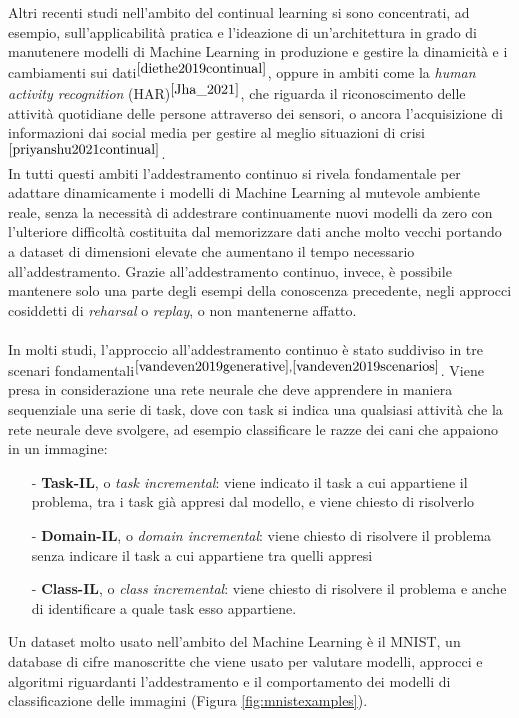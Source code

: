 Altri recenti studi nell'ambito del continual learning si sono concentrati, ad esempio, sull'applicabilità pratica e l'ideazione di un'architettura in grado di manutenere modelli di Machine Learning in produzione e gestire la dinamicità e i cambiamenti sui dati$^{\cite{diethe2019continual}}$, oppure in ambiti come la \textit{human activity recognition} (HAR)$^{\cite{Jha_2021}}$, che riguarda il riconoscimento delle attività quotidiane delle persone attraverso dei sensori, o ancora l'acquisizione di informazioni dai social media per gestire al meglio situazioni di crisi$^{\cite{priyanshu2021continual}}$.\\
In tutti questi ambiti l'addestramento continuo si rivela fondamentale per adattare dinamicamente i modelli di Machine Learning al mutevole ambiente reale, senza la necessità di addestrare continuamente nuovi modelli da zero con l'ulteriore difficoltà costituita dal memorizzare dati anche molto vecchi portando a dataset di dimensioni elevate che aumentano il tempo necessario all'addestramento. Grazie all'addestramento continuo, invece, è possibile mantenere solo una parte degli esempi della conoscenza precedente, negli approcci cosiddetti di \textit{reharsal} o \textit{replay}, o non mantenerne affatto.\\\\
In molti studi, l'approccio all'addestramento continuo è stato suddiviso in tre scenari fondamentali$^{\cite{vandeven2019generative},\cite{vandeven2019scenarios}}$. Viene presa in considerazione una rete neurale che deve apprendere in maniera sequenziale una serie di task, dove con task si indica una qualsiasi attività che la rete neurale deve svolgere, ad esempio classificare le razze dei cani che appaiono in un immagine:
\begin{itemize}
    \item[-] \textbf{Task-IL}, o \textit{task incremental}: viene indicato il task a cui appartiene il problema, tra i task già appresi dal modello, e viene chiesto di risolverlo
    \item[-] \textbf{Domain-IL}, o \textit{domain incremental}: viene chiesto di risolvere il problema senza indicare il task a cui appartiene tra quelli appresi
    \item[-] \textbf{Class-IL}, o \textit{class incremental}: viene chiesto di risolvere il problema e anche di identificare a quale task esso appartiene.
\end{itemize}
Un dataset molto usato nell'ambito del Machine Learning è il MNIST, un database di cifre manoscritte che viene usato per valutare modelli, approcci e algoritmi riguardanti l'addestramento e il comportamento dei modelli di classificazione delle immagini (Figura \ref{fig:mnistexamples}).

